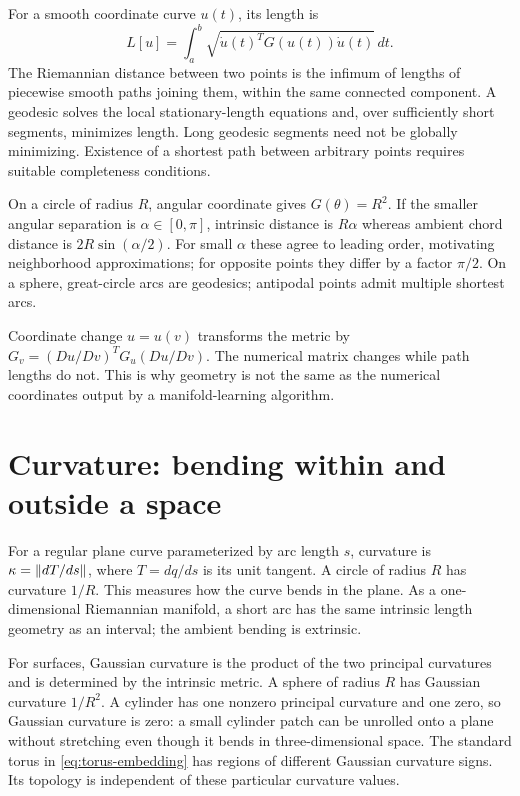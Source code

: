 For a smooth coordinate curve $u(t)$, its length is
\begin{equation}
L[u]=\int_a^b\sqrt{\dot u(t)^TG(u(t))\dot u(t)}\,dt.
\end{equation}
The Riemannian distance between two points is the infimum of lengths of piecewise smooth paths joining them, within the same connected component. A geodesic solves the local stationary-length equations and, over sufficiently short segments, minimizes length. Long geodesic segments need not be globally minimizing. Existence of a shortest path between arbitrary points requires suitable completeness conditions.

On a circle of radius $R$, angular coordinate gives $G(\theta)=R^2$. If the smaller angular separation is $\alpha\in[0,\pi]$, intrinsic distance is $R\alpha$ whereas ambient chord distance is $2R\sin(\alpha/2)$. For small $\alpha$ these agree to leading order, motivating neighborhood approximations; for opposite points they differ by a factor $\pi/2$. On a sphere, great-circle arcs are geodesics; antipodal points admit multiple shortest arcs.

Coordinate change $u=u(v)$ transforms the metric by $G_v=(Du/Dv)^TG_u(Du/Dv)$. The numerical matrix changes while path lengths do not. This is why geometry is not the same as the numerical coordinates output by a manifold-learning algorithm.

\section{Curvature: bending within and outside a space}
For a regular plane curve parameterized by arc length $s$, curvature is $\kappa=\left\lVert dT/ds\right\rVert$, where $T=dq/ds$ is its unit tangent. A circle of radius $R$ has curvature $1/R$. This measures how the curve bends in the plane. As a one-dimensional Riemannian manifold, a short arc has the same intrinsic length geometry as an interval; the ambient bending is extrinsic.

For surfaces, Gaussian curvature is the product of the two principal curvatures and is determined by the intrinsic metric. A sphere of radius $R$ has Gaussian curvature $1/R^2$. A cylinder has one nonzero principal curvature and one zero, so Gaussian curvature is zero: a small cylinder patch can be unrolled onto a plane without stretching even though it bends in three-dimensional space. The standard torus in \eqref{eq:torus-embedding} has regions of different Gaussian curvature signs. Its topology is independent of these particular curvature values.

